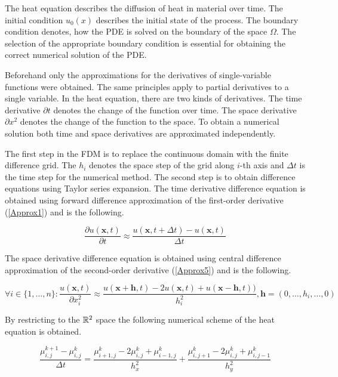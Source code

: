 The heat equation describes the diffusion of heat in material over time.
The initial condition \(u_0(x)\) describes the initial state of the process.
The boundary condition denotes, how the PDE is solved on the boundary of the space \(\Omega\).
The selection of the appropriate boundary condition is essential for obtaining the correct numerical solution of the PDE.

Beforehand only the approximations for the derivatives of single-variable functions were obtained.
The same principles apply to partial derivatives to a single variable.
In the heat equation, there are two kinds of derivatives.
The time derivative \(\partial t\) denotes the change of the function over time.
The space derivative \(\partial x^2\) denotes the change of the function to the space.
To obtain a numerical solution both time and space derivatives are approximated independently.

The first step in the FDM is to replace the continuous domain with the finite difference grid.
The \(h_{i}\) denotes the space step of the grid along \(i\)-th axis and \(\Delta t\) is the time step for the numerical method.
The second step is to obtain difference equations using Taylor series expansion.
The time derivative difference equation is obtained using forward difference approximation of the first-order derivative (\ref{Approx1}) and is the following.

\begin{equation}
 \frac{\partial u(\boldsymbol x, t)}{\partial t} \approx \frac{u(\boldsymbol x, t + \Delta t) - u(\boldsymbol x, t) }{\Delta t}
\end{equation}

The space derivative difference equation is obtained using central difference approximation of the second-order derivative (\ref{Approx5}) and is the following.

\begin{equation}
 \forall i \in \{1, \dots, n\}: \frac{u(\boldsymbol x, t)}{\partial x_i^2} \approx \frac{u(\boldsymbol x + \boldsymbol h, t) - 2 u(\boldsymbol x, t) + u(\boldsymbol x - \boldsymbol h, t) ) }{h^2_i}, \boldsymbol h = (0, \dots, h_{i}, \dots, 0)
\end{equation}

By restricting to the \(\Bbb{R}^2\) space the following numerical scheme of the heat equation is obtained.

\begin{equation} \label{NumericScheme1}
 \frac{\mu_{i,j}^{k+1} - \mu^k_{i,j}}{\Delta t} = \frac{\mu^k_{i+1,j} - 2 \mu^k_{i,j} + \mu^k_{i-1,j}}{h^2_{x}} + \frac{\mu^k_{i,j+1} - 2 \mu^k_{i,j} + \mu^k_{i,j-1}}{h^2_{y}}
\end{equation}

